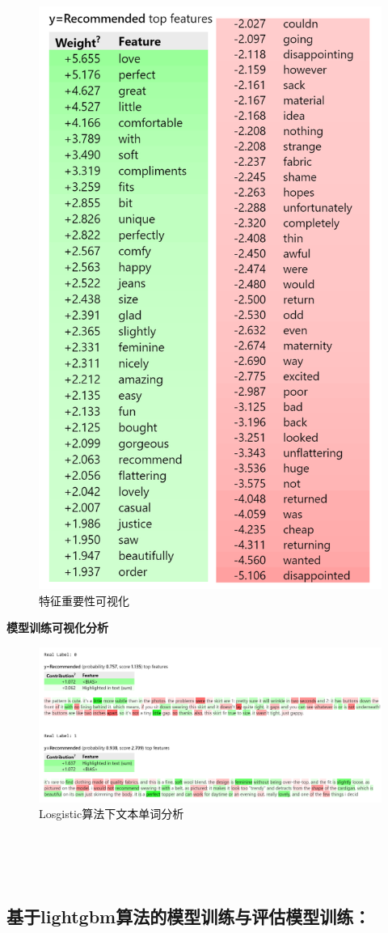 \documentclass[
  journal=medium,
  manuscript=article-type,
  year=2023,
  volume=37,
]{cup-journal}
\begin{document}
\begin{figure}[hbt!]
    \centering
    \includegraphics[width=0.5\linewidth]{feature_importance.png}
    \caption{特征重要性可视化}
    \label{feature_importance}
\end{figure}

\noindent \textbf{模型训练可视化分析}

\begin{figure}[hbt!]
    \centering
    \includegraphics[width=1.0\linewidth]{text.png}
    \caption{Losgistic算法下文本单词分析}
    \label{text}
\end{figure}

~\\
~\\
~\\

\subsection{基于lightgbm算法的模型训练与评估模型训练：}
\end{document}
